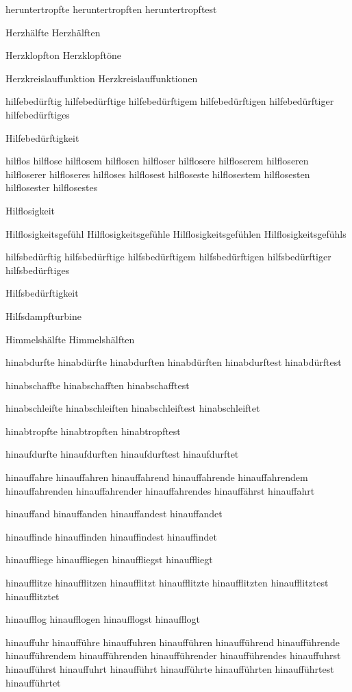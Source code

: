 heruntertropfte
heruntertropften
heruntertropftest

Herzhälfte
Herzhälften

Herzklopfton
Herzklopftöne

Herzkreislauffunktion
Herzkreislauffunktionen

hilfebedürftig
hilfebedürftige
hilfebedürftigem
hilfebedürftigen
hilfebedürftiger
hilfebedürftiges

Hilfebedürftigkeit

hilflos
hilflose
hilflosem
hilflosen
hilfloser
hilflosere
hilfloserem
hilfloseren
hilfloserer
hilfloseres
hilfloses
hilflosest
hilfloseste
hilflosestem
hilflosesten
hilflosester
hilflosestes

Hilflosigkeit

Hilflosigkeitsgefühl
Hilflosigkeitsgefühle
Hilflosigkeitsgefühlen
Hilflosigkeitsgefühls

hilfsbedürftig
hilfsbedürftige
hilfsbedürftigem
hilfsbedürftigen
hilfsbedürftiger
hilfsbedürftiges

Hilfsbedürftigkeit

Hilfsdampfturbine

Himmelshälfte
Himmelshälften

hinabdurfte
hinabdürfte
hinabdurften
hinabdürften
hinabdurftest
hinabdürftest

hinabschaffte
hinabschafften
hinabschafftest

hinabschleifte
hinabschleiften
hinabschleiftest
hinabschleiftet

hinabtropfte
hinabtropften
hinabtropftest

hinaufdurfte
hinaufdurften
hinaufdurftest
hinaufdurftet

hinauffahre
hinauffahren
hinauffahrend
hinauffahrende
hinauffahrendem
hinauffahrenden
hinauffahrender
hinauffahrendes
hinauffährst
hinauffahrt

hinauffand
hinauffanden
hinauffandest
hinauffandet

hinauffinde
hinauffinden
hinauffindest
hinauffindet

hinauffliege
hinauffliegen
hinauffliegst
hinauffliegt

hinaufflitze
hinaufflitzen
hinaufflitzt
hinaufflitzte
hinaufflitzten
hinaufflitztest
hinaufflitztet

hinaufflog
hinaufflogen
hinaufflogst
hinaufflogt

hinauffuhr
hinaufführe
hinauffuhren
hinaufführen
hinaufführend
hinaufführende
hinaufführendem
hinaufführenden
hinaufführender
hinaufführendes
hinauffuhrst
hinaufführst
hinauffuhrt
hinaufführt
hinaufführte
hinaufführten
hinaufführtest
hinaufführtet

